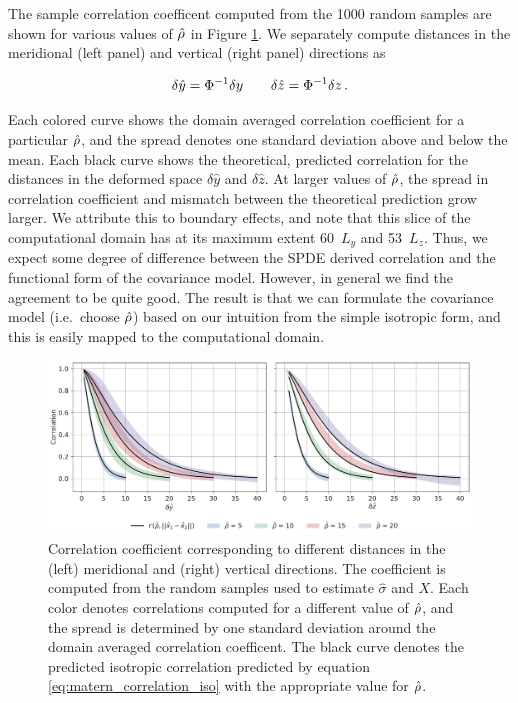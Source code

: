The sample correlation coefficent computed from the 1000 random samples are
shown for various values of $\hat{\rho}$ in Figure \ref{fig:matern_correlations}.
We separately compute distances in the meridional (left panel) and vertical
(right panel) directions as
\begin{linenomath*}\begin{equation*}
    \delta \hat{y} = \Phi^{-1}\delta y
    \qquad
    \delta \hat{z} = \Phi^{-1}\delta z \, .
\end{equation*}\end{linenomath*}
Each colored curve shows the domain averaged correlation coefficient for a
particular $\hat{\rho}$, and the spread denotes one standard deviation above and
below the mean.
Each black curve shows the theoretical, predicted correlation for the distances
in the deformed space $\delta\hat{y}$ and $\delta\hat{z}$.
At larger values of $\hat{\rho}$, the spread in correlation coefficient and
mismatch between the theoretical prediction grow larger.
We attribute this to boundary effects, and note that this slice of the
computational domain has at its maximum extent 60~$L_y$ and 53~$L_z$.
Thus, we expect some degree of difference between the SPDE derived correlation
and the functional form of the covariance model.
However, in general we find the agreement to be quite good.
The result is that we can formulate the covariance model (i.e.\ choose
$\hat{\rho}$) based on our intuition from the simple isotropic form, and this is
easily mapped to the computational domain.

\begin{figure}
    \centering
    \includegraphics[width=\textwidth]{../figures/nondimensional_correlation.pdf}
    \caption{Correlation coefficient corresponding to different distances in the
        (left) meridional and (right) vertical directions. The coefficient is
        computed from the random samples used to estimate
        $\hat{\sigma}$ and $X$. Each color denotes correlations computed for a
        different value of $\hat{\rho}$, and the spread is determined by one standard
        deviation around the domain averaged correlation coefficent.
        The black curve denotes the predicted isotropic correlation predicted by
        equation \eqref{eq:matern_correlation_iso} with the appropriate value for
        $\hat{\rho}$.}
    \label{fig:matern_correlations}
\end{figure}

